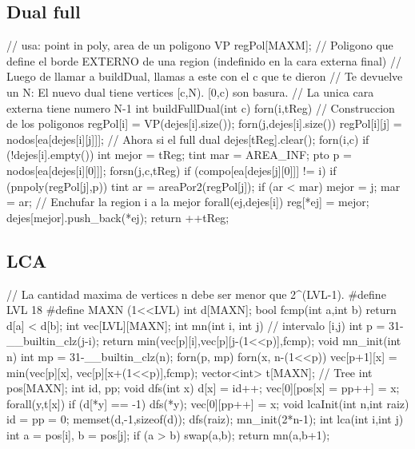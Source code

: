 \documentclass[10pt,landscape,twocolumn,a4paper,notitlepage]{article}
\begin{document}
\subsection{Dual full}
\begin{code}
// usa: point in poly, area de un poligono
VP regPol[MAXM]; // Poligono que define el borde EXTERNO de una region (indefinido en la cara externa final)
// Luego de llamar a buildDual, llamas a este con el c que te dieron
// Te devuelve un N: El nuevo dual tiene vertices [c,N). [0,c) son basura.
// La unica cara externa tiene numero N-1
int buildFullDual(int c) {
    forn(i,tReg) { // Construccion de los poligonos
        regPol[i] = VP(dejes[i].size());
        forn(j,dejes[i].size())
            regPol[i][j] = nodos[ea[dejes[i][j]]];
    } // Ahora si el full dual
    dejes[tReg].clear();
    forn(i,c)
    if (!dejes[i].empty()) {
        int mejor = tReg;
        tint mar = AREA_INF;
        pto p = nodos[ea[dejes[i][0]]];
        forsn(j,c,tReg)
        if (compo[ea[dejes[j][0]]] != i) {
            if (pnpoly(regPol[j],p)) {
                tint ar = areaPor2(regPol[j]);
                if (ar < mar) {
                    mejor = j;
                    mar = ar;
        } } }
        // Enchufar la region i a la mejor
        forall(ej,dejes[i]) {
            reg[*ej] = mejor;
            dejes[mejor].push_back(*ej);
        }
    }
    return ++tReg;
}
\end{code}
\subsection{LCA}
\begin{code}
// La cantidad maxima de vertices n debe ser menor que 2^(LVL-1).
#define LVL 18
#define MAXN (1<<LVL)
int d[MAXN];
bool fcmp(int a,int b) { return d[a] < d[b];}
int vec[LVL][MAXN];
int mn(int i, int j) { // intervalo [i,j)
	int p = 31-__builtin_clz(j-i);
	return min(vec[p][i],vec[p][j-(1<<p)],fcmp);
}
void mn_init(int n) {
	int mp = 31-__builtin_clz(n);
	forn(p, mp) forn(x, n-(1<<p)) vec[p+1][x] = min(vec[p][x], vec[p][x+(1<<p)],fcmp);
}
vector<int> t[MAXN]; // Tree
int pos[MAXN];
int id, pp;
void dfs(int x) {
	d[x] = id++;
	vec[0][pos[x] = pp++] = x;
	forall(y,t[x])
	if (d[*y] == -1) {
		dfs(*y);
		vec[0][pp++] = x;
	}
}
void lcaInit(int n,int raiz) {
	id = pp = 0;
	memset(d,-1,sizeof(d));
	dfs(raiz);
	mn_init(2*n-1);
}
int lca(int i,int j) {
	int a = pos[i], b = pos[j];
	if (a > b) swap(a,b);
	return mn(a,b+1);
}
\end{code}
\end{document}
